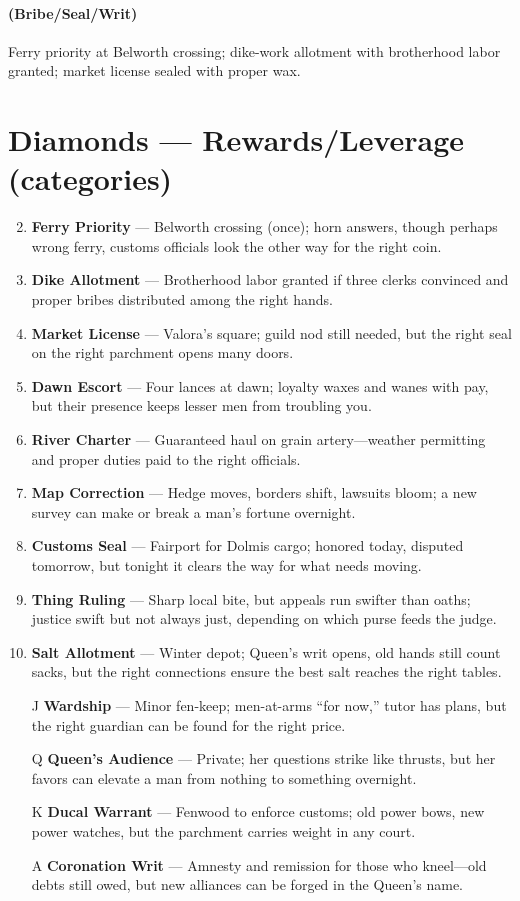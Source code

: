 \paragraph*{(Bribe/Seal/Writ)} Ferry priority at Belworth crossing; dike-work allotment with brotherhood labor granted; market license sealed with proper wax.

\section*{Diamonds --- Rewards/Leverage (categories)}
\label{sec:viterra-rewards}
\begin{enumerate}
\setcounter{enumi}{1}
\item \textbf{Ferry Priority} --- Belworth crossing (once); horn answers, though perhaps wrong ferry, customs officials look the other way for the right coin.
\item \textbf{Dike Allotment} --- Brotherhood labor granted if three clerks convinced and proper bribes distributed among the right hands.
\item \textbf{Market License} --- Valora's square; guild nod still needed, but the right seal on the right parchment opens many doors.
\item \textbf{Dawn Escort} --- Four lances at dawn; loyalty waxes and wanes with pay, but their presence keeps lesser men from troubling you.
\item \textbf{River Charter} --- Guaranteed haul on grain artery—weather permitting and proper duties paid to the right officials.
\item \textbf{Map Correction} --- Hedge moves, borders shift, lawsuits bloom; a new survey can make or break a man's fortune overnight.
\item \textbf{Customs Seal} --- Fairport for Dolmis cargo; honored today, disputed tomorrow, but tonight it clears the way for what needs moving.
\item \textbf{Thing Ruling} --- Sharp local bite, but appeals run swifter than oaths; justice swift but not always just, depending on which purse feeds the judge.
\item \textbf{Salt Allotment} --- Winter depot; Queen's writ opens, old hands still count sacks, but the right connections ensure the best salt reaches the right tables.
\item[J] \textbf{Wardship} --- Minor fen-keep; men-at-arms ``for now,'' tutor has plans, but the right guardian can be found for the right price.
\item[Q] \textbf{Queen's Audience} --- Private; her questions strike like thrusts, but her favors can elevate a man from nothing to something overnight.
\item[K] \textbf{Ducal Warrant} --- Fenwood to enforce customs; old power bows, new power watches, but the parchment carries weight in any court.
\item[A] \textbf{Coronation Writ} --- Amnesty and remission for those who kneel—old debts still owed, but new alliances can be forged in the Queen's name.
\end{enumerate}

